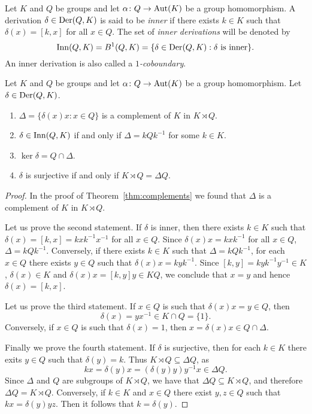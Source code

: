 Let $K$ and $Q$ be groups and let $\alpha\colon Q\rightarrow \operatorname{Aut}(K)$ be a group homomorphism.
A derivation $\delta\in\operatorname{Der}(Q,K)$ is said to be {\em inner} if there exists $k\in K$ 
such that $\delta(x)=[k,x]$ for all $x\in Q$. The set of 
{\em inner derivations} will be denoted by 
\[
		\mathrm{Inn}(Q,K)=B^1(Q,K)=\{\delta\in\operatorname{Der}(Q,K):\text{$\delta$ is inner}\}.
\]
An inner derivation is also called a {\em $1$-coboundary}.

\begin{theorem}[Sysak]
	\label{theorem:Sysak}
	Let $K$ and $Q$ be groups and let $\alpha\colon Q\rightarrow \operatorname{Aut}(K)$ be a group homomorphism. Let
	$\delta\in\operatorname{Der}(Q,K)$.
	\begin{enumerate}
		\item $\Delta=\{\delta(x)x:x\in Q\}$ is a complement of $K$ in $K\rtimes Q$.
		\item $\delta\in\mathrm{Inn}(Q,K)$ if and only if $\Delta=kQ k^{-1}$ for some $k\in K$.
		\item $\ker\delta=Q\cap\Delta$.
		\item $\delta$ is surjective if and only if $K\rtimes Q=\Delta Q$.
	\end{enumerate}
\end{theorem}

\begin{proof}
	In the proof of Theorem~\ref{thm:complements} we 
	found that $\Delta$ is a complement of $K$ in $K\rtimes Q$. 

	Let us prove the second statement. If $\delta$ is inner, then there exists 
    $k\in K$ such that $\delta(x)=[k,x]=kxk^{-1}x^{-1}$ for all $x\in
	Q$. Since $\delta(x)x=kxk^{-1}$ for all $x\in Q$,  $\Delta=kQk^{-1}$.
	Conversely, if there exists $k\in K$ such that $\Delta=kQk^{-1}$, for each 
	$x\in Q$ there exists $y\in Q$ such that $\delta(x)x=kyk^{-1}$. Since
	$[k,y]=kyk^{-1}y^{-1}\in K$, $\delta(x)\in K$ and $\delta(x)x=[k,y]y\in KQ$,
	we conclude that  $x=y$ and hence $\delta(x)=[k,x]$. 

	Let us prove the third statement. If $x\in Q$ is such that $\delta(x)x=y\in
	Q$, then \[
	\delta(x)=yx^{-1}\in K\cap Q=\{1\}.
	\]
	Conversely, if $x\in Q$
	is such that $\delta(x)=1$, then $x=\delta(x)x\in Q\cap\Delta$. 

	Finally we prove the fourth statement. If $\delta$ is surjective, then for each 
	$k\in K$ there exits $y\in Q$ such that $\delta(y)=k$. Thus $K\rtimes Q\subseteq
	\Delta Q$, as 
	\[
	kx=\delta(y)x=(\delta(y)y)y^{-1}x\in \Delta Q.
	\]
	Since $\Delta$ and $Q$ are subgroups of $K\rtimes Q$, we have that 
	$\Delta Q\subseteq K\rtimes Q$, and therefore $\Delta Q=K\rtimes Q$.
	Conversely, if $k\in K$ and $x\in Q$ there exist  
	$y,z\in Q$ such that $kx=\delta(y)yz$. Then it follows that 
	$k=\delta(y)$. 
\end{proof}

